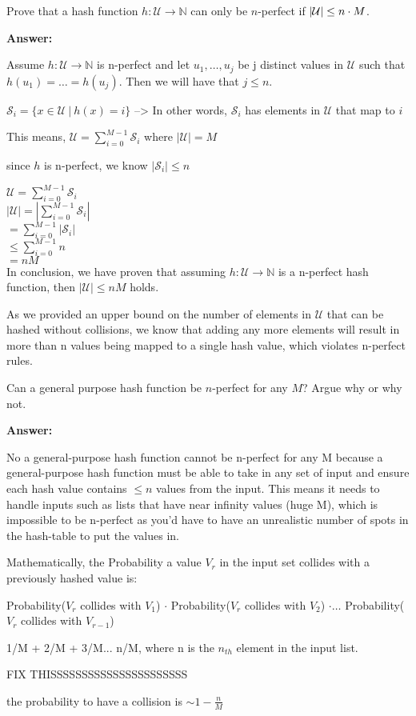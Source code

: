 \begin{problem}
\begin{questions}
\item Prove that a hash function $h : \mathcal{U} \rightarrow \mathbb{N}$ can only be $n$-perfect if $\lvert \mathcal{U} \rvert \leq n \cdot M$.

\textbf{Answer:}

Assume $h : \mathcal{U} \rightarrow \mathbb{N}$ is n-perfect and let 
$u_1, \dots, u_j$ be j distinct values in $\mathcal{U}$ such that $h(u_1) = \dots = h(u_j)$. Then we will have that $j \leq n$.

$\mathcal{S}_i = \{x \in \mathcal{U}\:|\:h(x) = i\}$ --> In other words, $\mathcal{S}_i$ has elements in $\mathcal{U}$ that map to $i$

This means, $\mathcal{U} = \sum_{i=0}^{M-1} \mathcal{S}_i$ where $|\mathcal{U}| = M$

since $h$ is n-perfect, we know $|\mathcal{S}_i| \leq n$

$\mathcal{U} = \sum_{i=0}^{M-1} \mathcal{S}_i$\\
$|\mathcal{U}| = |\sum_{i=0}^{M-1} \mathcal{S}_i|$\\
$ = \sum_{i=0}^{M-1} |\mathcal{S}_i|$\\
$ \leq \sum_{i=0}^{M-1} n$\\
$ = nM $\\

In conclusion, we have proven that assuming $h : \mathcal{U} \rightarrow \mathbb{N}$ is a n-perfect hash function, then $|\mathcal{U}| \leq nM$ holds.

As we provided an upper bound on the number of elements in $\mathcal{U}$ that can be hashed without collisions, we know that adding any more elements will result in more than n values being mapped to a single hash value, which violates n-perfect rules.

\item Can a general purpose hash function be $n$-perfect for any $M$? Argue why or why not.

\textbf{Answer: }

No a general-purpose hash function cannot be n-perfect for any M because a general-purpose hash function must be able to take in any set of input and ensure each hash value contains $\leq n$ values from the input. 
This means it needs to handle inputs such as lists that have near infinity values (huge M), which is impossible to be n-perfect as you'd have to have an unrealistic number of spots in the hash-table to put the values in.

Mathematically, the Probability a value $V_r$ in the input set collides with a previously hashed value is:

Probability($V_r$ collides with $V_1$) $\cdot$ Probability($V_r$ collides with $V_2$) $\cdot \dots$ Probability($V_r$ collides with $V_{r-1}$)

1/M + 2/M + 3/M... n/M, where n is the $n_{th}$ element in the input list.

FIX THISSSSSSSSSSSSSSSSSSSSSS

the probability to have a collision is $\sim 1 - \frac{n}{M}$

\end{questions}
\end{problem}

